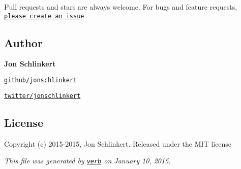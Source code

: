 Pull requests and stars are always welcome. For bugs and feature requests, \href{https://github.com/jonschlinkert/preserve/issues}{\tt please create an issue}

\subsection*{Author}

{\bfseries Jon Schlinkert}


\begin{DoxyItemize}
\item \href{https://github.com/jonschlinkert}{\tt github/jonschlinkert}
\item \href{http://twitter.com/jonschlinkert}{\tt twitter/jonschlinkert}
\end{DoxyItemize}

\subsection*{License}

Copyright (c) 2015-\/2015, Jon Schlinkert. Released under the M\+IT license





{\itshape This file was generated by \href{https://github.com/assemble/verb}{\tt verb} on January 10, 2015.} 